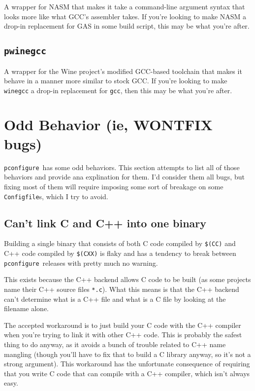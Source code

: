 \documentclass{article}
\newcommand{\pconfigure}{\texttt{pconfigure}}
\begin{document}
A wrapper for NASM that makes it take a command-line argument syntax
that looks more like what GCC's assembler takes.  If you're looking to
make NASM a drop-in replacement for GAS in some build script, this may
be what you're after.

\subsection{\texttt{pwinegcc}}

A wrapper for the Wine project's modified GCC-based toolchain that
makes it behave in a manner more similar to stock GCC.  If you're
looking to make \texttt{winegcc} a drop-in replacement for
\texttt{gcc}, then this may be what you're after.

\section{Odd Behavior (ie, WONTFIX bugs) \label{odd}}

\pconfigure\ has some odd behaviors.  This section attempts to list
all of those behaviors and provide ana explination for them.  I'd
consider them all bugs, but fixing most of them will require imposing
some sort of breakage on some \texttt{Configfile}s, which I try to
avoid.

\subsection{Can't link C and C++ into one binary}

Building a single binary that consists of both C code compiled by
\texttt{\$(CC)} and C++ code compiled by \texttt{\$(CXX)} is flaky and
has a tendency to break between \pconfigure\ releases with pretty much
no warning.

This exists because the C++ backend allows C code to be built (as some
projects name their C++ source files \texttt{*.c}).  What this means
is that the C++ backend can't determine what is a C++ file and what is
a C file by looking at the filename alone.

The accepted workaround is to just build your C code with the C++
compiler when you're trying to link it with other C++ code.  This is
probably the safest thing to do anyway, as it avoids a bunch of
trouble related to C++ name mangling (though you'll have to fix that
to build a C library anyway, so it's not a strong argument).  This
workaround has the unfortunate consequence of requiring that you write
C code that can compile with a C++ compiler, which isn't always easy.
\end{document}

